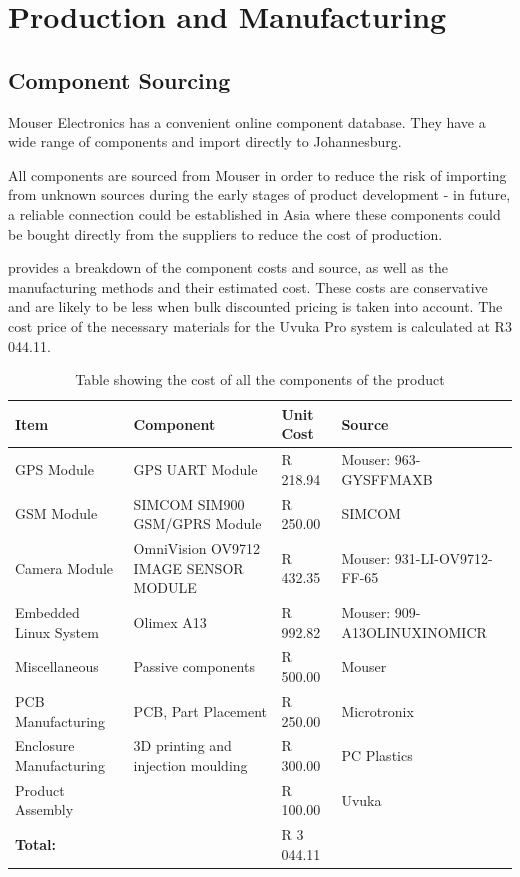 \section{Production and Manufacturing}
\subsection{Component Sourcing}
Mouser Electronics has a convenient online component database. They have a wide range of components and import directly to Johannesburg. 

All components are sourced from Mouser in order to reduce the risk of importing from unknown sources during the early stages of product development - in future, a reliable connection could be established in Asia where these components could be bought directly from the suppliers to reduce the cost of production. 

 provides a breakdown of the component costs and source, as well as the manufacturing methods and their estimated cost. These costs are conservative and are likely to be less when bulk discounted pricing is taken into account. The cost price of the necessary materials for the Uvuka Pro system is calculated at R3 044.11. 

\begin{table}[htbp]
  \centering
  \caption{Table showing the cost of all the components of the product}
    \begin{tabular}{k{0.2\textwidth}k{0.15\textwidth}R{0.15\textwidth}k{0.3\textwidth}}
    \toprule
    \textbf{Item} & \textbf{Component} & \textbf{Unit Cost} & \textbf{Source} \\
    \midrule
	GPS Module & GPS UART Module & R 218.94 & Mouser: 963-GYSFFMAXB \\ \midrule
    GSM Module & SIMCOM SIM900 GSM/GPRS Module & R 250.00 & SIMCOM \\ \midrule
    Camera Module & OmniVision OV9712 IMAGE SENSOR MODULE & R 432.35 & Mouser: 931-LI-OV9712-FF-65  \\ \midrule
    Embedded Linux System & Olimex A13 & R 992.82 & Mouser: 909-A13OLINUXINOMICR \\ \midrule
    Miscellaneous  & Passive components & R 500.00 & Mouser \\ \midrule
    PCB Manufacturing & PCB, Part Placement & R 250.00 & Microtronix \\ \midrule
    Enclosure Manufacturing & 3D printing and injection moulding & R 300.00 & PC Plastics \\ \midrule
    Product Assembly &       & R 100.00 & Uvuka \\ \midrule

    \textbf{Total:} &       & R 3 044.11 &  \\
    \bottomrule
    \end{tabular}%
  \label{tab:productCost}%
\end{table}%

